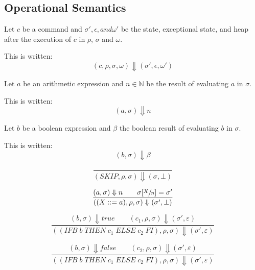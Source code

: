 \subsection{Operational Semantics}

\begin{notation}
Let $c$ be a command and $\sigma',\epsilon, and \omega'$ be the state, exceptional state, and heap after the execution of $c$ in $\rho$, $\sigma$ and $\omega$.

This is written:
\begin{equation}
(c,\rho,\sigma,\omega) \Downarrow (\sigma',\epsilon,\omega')
\end{equation}
\end{notation}

\begin{notation}
Let $a$ be an arithmetic expression and $n\in\mathbb{N}$ be the result of evaluating $a$ in $\sigma$.

This is written:
\begin{equation}
(a,\sigma) \Downarrow n
\end{equation}
\end{notation}

\begin{notation}
Let $b$ be a boolean expression and $\beta$ the boolean result of evaluating $b$ in $\sigma$.

This is written:
\begin{equation}
(b,\sigma) \Downarrow \beta
\end{equation}
\end{notation}

\begin{equation}
\frac{}{(SKIP, \rho, \sigma) \Downarrow (\sigma, \bot)}
\end{equation}

\begin{equation}
\frac{(a, \sigma) \Downarrow n \qquad \sigma[\sfrac{X}{n}] = \sigma'}{((X ::= a), \rho, \sigma) \Downarrow (\sigma', \bot)}
\end{equation}

\begin{equation}
\frac{(b, \sigma) \Downarrow true \qquad (c_1, \rho, \sigma) \Downarrow (\sigma', \varepsilon)}{((IFB\; b\; THEN\; c_1\; ELSE\; c_2\; FI), \rho, \sigma) \Downarrow (\sigma', \varepsilon)}
\end{equation}

\begin{equation}
\frac{(b, \sigma) \Downarrow false \qquad (c_2, \rho, \sigma) \Downarrow (\sigma', \varepsilon)}{((IFB\; b\; THEN\; c_1\; ELSE\; c_2\; FI), \rho, \sigma) \Downarrow (\sigma', \varepsilon)}
\end{equation}

